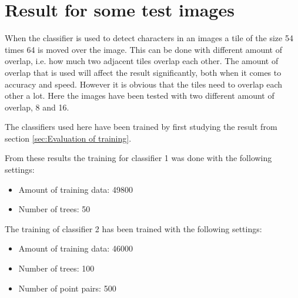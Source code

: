 \section{Result for some test images}
\label{sec:Result for some test images}
%

When the classifier is used to detect characters in an images a tile of the size 54 times 64 is moved over the image. This can be done with different amount of overlap, i.e. how much two adjacent tiles overlap each other. The amount of overlap that is used will affect the result significantly, both when it comes to accuracy and speed. However it is obvious that the tiles need to overlap each other a lot. Here the images have been tested with two different amount of overlap, 8 and 16.

The classifiers used here have been trained by first studying the result from section \ref{sec:Evaluation of training}. 

From these results the training for classifier 1 was done with the following settings:
\begin{center}
\begin{itemize}
\item Amount of training data: 49800
\item Number of trees: 50
\end{itemize}
\end{center} 
The training of classifier 2 has been trained with the following settings:
\begin{center}
\begin{itemize}
\item Amount of training data: 46000
\item Number of trees: 100
\item Number of point pairs: 500
\end{itemize} 
\end{center}

